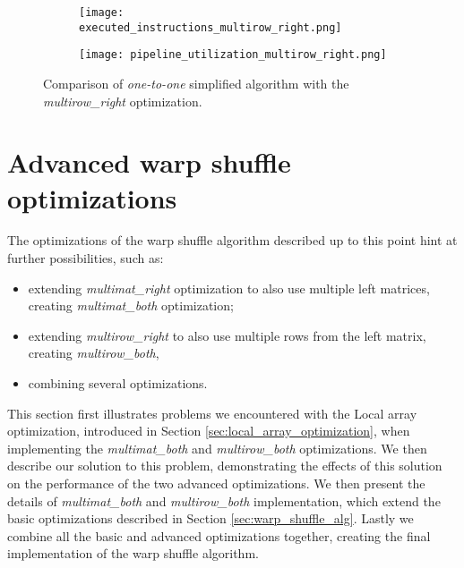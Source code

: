 \begin{figure}[ht]
	\centering	
	\begin{subfigure}{\textwidth}
		\centering
		\texttt{[image: executed\_instructions\_multirow\_right.png]}
		\label{fig:executed_instructions_multirow_right}
	\end{subfigure}
	\hfill
	\begin{subfigure}{\textwidth}
		\centering
		\texttt{[image: pipeline\_utilization\_multirow\_right.png]}
		\label{fig:pipeline_utilization_multirow_right}
	\end{subfigure}
	
	\caption{Comparison of \textit{one-to-one} simplified algorithm with the \textit{multirow\_right} optimization.}
	\label{fig:multirow_right_profiling}
\end{figure}


\section{Advanced warp shuffle optimizations}

The optimizations of the warp shuffle algorithm described up to this point hint at further possibilities, such as:
\begin{itemize}
	\item extending \textit{multimat\_right} optimization to also use multiple left matrices, creating \textit{multimat\_both} optimization;
	\item extending \textit{multirow\_right} to also use multiple rows from the left matrix, creating \textit{multirow\_both},
	\item combining several optimizations.
\end{itemize}

This section first illustrates problems we encountered with the Local array optimization, introduced in Section \ref{sec:local_array_optimization}, when implementing the \textit{multimat\_both} and \textit{multirow\_both} optimizations.
We then describe our solution to this problem, demonstrating the effects of this solution on the performance of the two advanced optimizations. We then present the details of \textit{multimat\_both} and \textit{multirow\_both} implementation, which extend the basic optimizations described in Section \ref{sec:warp_shuffle_alg}. Lastly we combine all the basic and advanced optimizations together, creating the final implementation of the warp shuffle algorithm. 


